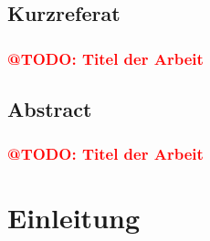 \documentclass[a4paper,12pt, twoside]{scrreprt}
\begin{document}
%
%

\newpage
\section*{Kurzreferat}

\subsection*{\textcolor{red}{@TODO: Titel der Arbeit}}


\newpage
\section*{Abstract}
\subsection*{\textcolor{red}{@TODO: Titel der Arbeit}}


\cleardoublepage   %
\tableofcontents

\chapter{Einleitung}

\end{document}
